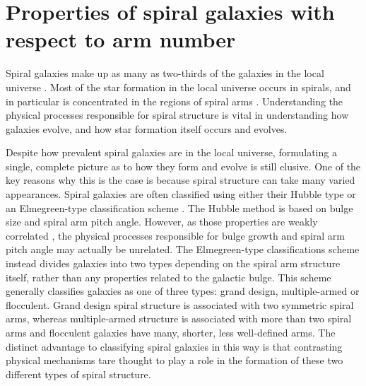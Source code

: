 \documentclass[useAMS,usenatbib]{mn2e}
\begin{document}
\section{Properties of spiral galaxies with respect to arm number}
\label{sec:results}

Spiral galaxies make up as many as two-thirds of the galaxies in the local universe \citep{Lintott_11,Willett_13}. Most of the star formation in the local universe occurs in spirals, and in particular is concentrated in the regions of spiral arms \citep{Grosbol_12,Dobbs_14}. Understanding the physical processes responsible for spiral structure is vital in understanding how galaxies evolve, and how star formation itself occurs and evolves.

Despite how prevalent spiral galaxies are in the local universe, formulating a single, complete picture as to how they form and evolve is still elusive. One of the key reasons why this is the case is because spiral structure can take many varied appearances. Spiral galaxies are often classified using either their Hubble type \citep{Hubble_26} or an Elmegreen-type classification scheme \citep{EE_82,EE_87}. The Hubble method is based on bulge size and spiral arm pitch angle. However, as those properties are weakly correlated \citep{Kennicutt_81,Seigar_98}, the physical processes responsible for bulge growth and spiral arm pitch angle may actually be unrelated. The Elmegreen-type classifications scheme instead divides galaxies into two types depending on the spiral arm structure itself, rather than any properties related to the galactic bulge. This scheme generally classifies galaxies as one of three types: grand design, multiple-armed or flocculent. Grand design spiral structure is associated with two symmetric spiral arms, whereas multiple-armed structure is associated with more than two spiral arms and flocculent galaxies have many, shorter, less well-defined arms. The distinct advantage to classifying spiral galaxies in this way is that contrasting physical mechanisms tare thought to play a role in the formation of these two different types of spiral structure.
\end{document}
